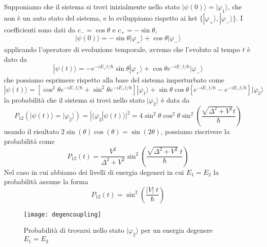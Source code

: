Supponiamo che il sistema si trovi inizialmente nello stato $|\psi(0)\rangle = |\varphi_1 \rangle $, che non \`e un auto stato del sistema, e lo sviluppiamo rispetto ai ket $\{|\varphi_+\rangle , |\varphi_- \rangle \}$. I coefficienti sono dati da $c_- = \cos \theta$ e $c_+ = - \sin \theta$, 
\begin{equation*}
	|\psi(0) \rangle  = -\sin\theta |\varphi_+ \rangle + \cos \theta |\varphi_- \rangle 
\end{equation*}
applicando l'operatore di evoluzione temporale, avremo che l'evoluto al tempo $t$ \`e dato da 
\begin{equation*}
	|\psi(t) \rangle =-e^{-iE_+ t/ \hbar}\sin{\theta}|\varphi_+ \rangle   + \cos\theta e^{-iE_-t/\hbar}|\varphi_- \rangle 
\end{equation*}
che possiamo esprimere rispetto alla base del sistema imperturbato come 
\begin{equation*}
	|\psi(t) \rangle =\left[\cos ^2 \theta e^{-i E_{-} t / \hbar}+\sin ^2 \theta e^{-i E_{+} t / \hbar}\right] |\varphi_1 \rangle +\sin \theta \cos \theta\left[e^{-i E_{-} t / \hbar}-e^{-i E_{+} t / \hbar}\right] |\varphi_2\rangle 
\end{equation*}
la probabilit\`a che il sistema si trovi nello stato $|\varphi_2 \rangle $ \`e data da 
\begin{equation*}
	P_{12}(|\psi(t) \rangle = |\varphi_2 \rangle) = |\langle \varphi_2| \psi(t) \rangle|^2 = 4\sin ^2 \theta \cos ^2 \theta \sin ^2 \left ( \frac{\sqrt{\Delta^2+V^2} t }{ \hbar} \right)
\end{equation*}
usando il risultato $2 \sin(\theta) \cos(\theta) = \sin(2 \theta)$, possiamo riscrivere la probabilit\`a come 
\begin{equation*}
 P_{12}(t) = \frac{V^2}{\Delta^2 + V^2}\sin^2 \left (\frac{\sqrt{\Delta^2 + V^2}\;t}{\hbar} \right )
\end{equation*}
Nel caso in cui abbiamo dei livelli di energia degeneri in cui $E_1 = E_2$ la probabilit\`a assume la forma 
\newpage 
\begin{equation*}
	P_{12}(t) = \sin^2 \left(\frac{|V|\;t}{\hbar}\right)
\end{equation*}
 
\begin{figure}[!ht]
\vspace{0.1in}
\texttt{[image: degencoupling]}	
\centering
\vspace{0.1in}
\caption{Probabilit\`a di trovarsi nello stato $|\varphi_2 \rangle $ per un energia degenere $E_1 =E_2$}
\end{figure}

